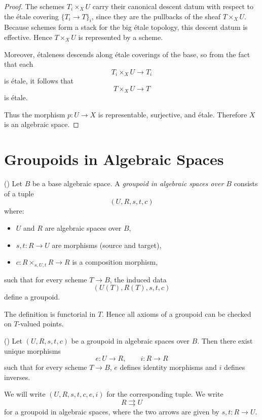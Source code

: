 \begin{proof}
	The schemes $T_i\times_X U$ carry their canonical descent datum with respect to the \'etale covering $\{T_i\to T\}_i$, since they are the pullbacks of the sheaf $T\times_X U$. Because schemes form a stack for the big \'etale topology, this descent datum is effective. Hence $T\times_X U$ is represented by a scheme.
	
	Moreover, \'etaleness descends along \'etale coverings of the base, so from the fact that each
	\[
	T_i\times_X U \to T_i
	\]
	is \'etale, it follows that
	\[
	T\times_X U \to T
	\]
	is \'etale.
	
	Thus the morphism $p:U\to X$ is representable, surjective, and \'etale. Therefore $X$ is an algebraic space.
\end{proof}



\section{Groupoids in Algebraic Spaces}

\begin{definition}
	\label{def:groupoid-in-alg-spaces}
	(\cite[][Tag 043V]{stacks-project})
	Let $B$ be a base algebraic space. A \emph{groupoid in algebraic spaces over $B$}
	consists of a tuple
	\[
	(U, R, s, t, c)
	\]
	where:
	\begin{itemize}
		\item $U$ and $R$ are algebraic spaces over $B$,
		\item $s,t : R \to U$ are morphisms (source and target),
		\item $c : R \times_{s,U,t} R \to R$ is a composition morphism,
	\end{itemize}
	such that for every scheme $T \to B$, the induced data
	\[
	(U(T), R(T), s, t, c)
	\]
	define a groupoid.
\end{definition}

\begin{remark}
	The definition is functorial in $T$. Hence all axioms of a groupoid can be
	checked on $T$-valued points.
\end{remark}

\begin{lemma}
	(\cite[][Tag 043V]{stacks-project})
	Let $(U,R,s,t,c)$ be a groupoid in algebraic spaces over $B$. Then there exist
	unique morphisms
	\[
	e : U \to R, \qquad i : R \to R
	\]
	such that for every scheme $T \to B$, $e$ defines identity morphisms and $i$ defines inverses.
	
	We will write $(U,R,s,t,c,e,i)$ for the corresponding tuple.
	We write
	\[
	R \rightrightarrows U
	\]
	for a groupoid in algebraic spaces, where the two arrows are given by
	$s,t : R \to U$.
\end{lemma}



